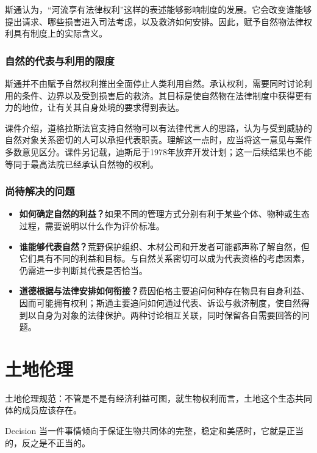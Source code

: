 \documentclass{ctexart}
\begin{document}
斯通认为，“河流享有法律权利”这样的表述能够影响制度的发展。它会改变谁能够提出请求、哪些损害进入司法考虑，以及救济如何安排。因此，赋予自然物法律权利具有制度上的实际含义。

\subsubsection{自然的代表与利用的限度}

斯通并不由赋予自然权利推出全面停止人类利用自然。承认权利，需要同时讨论利用的条件、边界以及受到损害后的救济。其目标是使自然物在法律制度中获得更有力的地位，让有关其自身处境的要求得到表达。

课件介绍，道格拉斯法官支持自然物可以有法律代言人的思路，认为与受到威胁的自然对象关系密切的人可以承担代表职责。理解这一点时，应当将这一意见与案件多数意见区分。课件另记载，迪斯尼于1978年放弃开发计划；这一后续结果也不能等同于最高法院已经承认自然物的权利。

\subsubsection{尚待解决的问题}

\begin{itemize}
    \item \textbf{如何确定自然的利益？}如果不同的管理方式分别有利于某些个体、物种或生态过程，需要说明以什么作为评价标准。
    \item \textbf{谁能够代表自然？}荒野保护组织、木材公司和开发者可能都声称了解自然，但它们具有不同的利益和目标。与自然关系密切可以成为代表资格的考虑因素，仍需进一步判断其代表是否恰当。
    \item \textbf{道德根据与法律安排如何衔接？}费因伯格主要追问何种存在物具有自身利益、因而可能拥有权利；斯通主要追问如何通过代表、诉讼与救济制度，使自然得到以自身为对象的法律保护。两种讨论相互关联，同时保留各自需要回答的问题。
\end{itemize}

\section{土地伦理}

土地伦理规范：不管是不是有经济利益可图，就生物权利而言，土地这个生态共同体的成员应该存在。

\begin{fancybox}{Decision}
    当一件事情倾向于保证生物共同体的完整，稳定和美感时，它就是正当的，反之是不正当的。
\end{fancybox}
\end{document}

